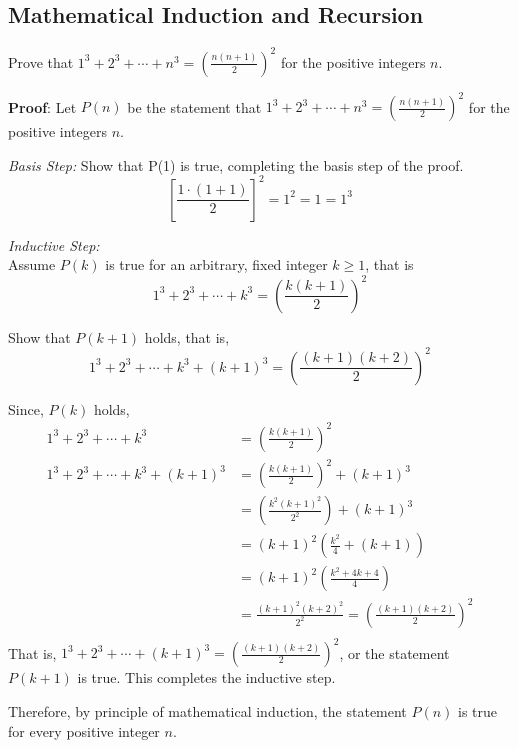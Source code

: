 \begin{questions}


\section*{Mathematical Induction and Recursion}

 Prove that $1^3 + 2^3 + \cdots + n^3 = \left( \frac{n(n+1)}{2} \right)^2$ for the positive integers $n$.
    \ifprintanswers
        \vspace{-10pt}
   \fi
\begin{solution}
  \textbf{Proof}: Let $P(n)$ be the statement that $1^3 + 2^3 + \cdots + n^3 = \left( \frac{n(n+1)}{2} \right)^2$ for the positive integers $n$.

  \textit{Basis Step:} Show that P(1) is true, completing the basis step of the proof.
        \[ \left[ \frac{1 \cdot (1+1) }{2} \right]^2 = 1^2 = 1 = 1^3 \]

  \textit{Inductive Step:}  \\
    Assume $P(k)$ is true for an arbitrary, fixed integer $k \geq 1$, that is
        \[ 1^3 + 2^3 + \cdots + k^3 = \left( \frac{k(k+1)}{2} \right)^2 \]

    
    Show that $P(k+1)$ holds, that is,
        \[ 1^3 + 2^3 + \cdots + k^3 + (k+1)^3 = \left( \frac{(k+1)(k+2)}{2} \right)^2 \]
    
    Since, $P(k)$ holds,
        \begin{align*}
            1^3 + 2^3 + \cdots + k^3 &= \left( \frac{k(k+1)}{2} \right)^2 \tag{Ind. Hyp.} \\
            1^3 + 2^3 + \cdots + k^3 + (k+1)^3 &=  \left( \frac{k(k+1)}{2} \right)^2 + (k+1)^3   \\
              &= \left(\frac{k^2(k+1)^2}{2^2} \right) + (k+1)^3 \\
              &= (k+1)^2 \left( \frac{k^2}{4} + (k + 1) \right) \\
              &= (k+1)^2 \left( \frac{k^2 + 4k + 4}{4} \right) \\
              &= \frac{(k+1)^2(k+2)^2}{2^2} =  \left( \frac{(k+1)(k+2)}{2} \right)^2\\
        \end{align*}
    That is, $1^3 + 2^3 + \cdots +(k+1)^3 = \left( \frac{(k+1)(k+2)}{2} \right)^2 $, or the statement $P(k+1)$ is true.  This completes the inductive step.

    Therefore, by principle of mathematical induction, the statement $P(n)$ is true for every positive integer $n$.
\end{solution}



\end{questions}
